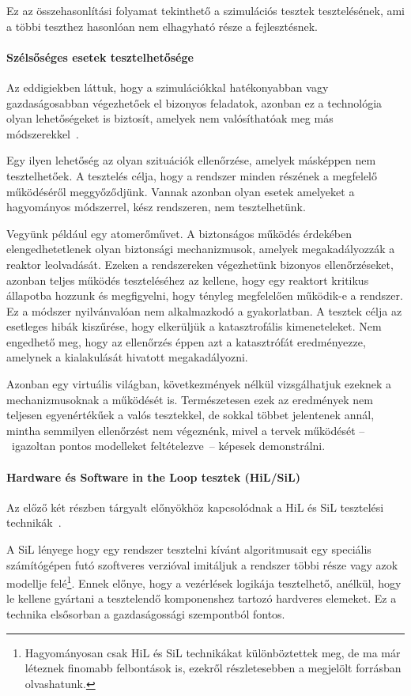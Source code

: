         Ez az összehasonlítási folyamat tekinthető a szimulációs tesztek tesztelésének, ami a többi teszthez hasonlóan nem elhagyható része a fejlesztésnek.

        \paragraph{Szélsőséges esetek tesztelhetősége}
        Az eddigiekben láttuk, hogy a szimulációkkal hatékonyabban vagy gazdaságosabban végezhetőek el bizonyos feladatok, azonban ez a technológia olyan lehetőségeket is biztosít, amelyek nem valósíthatóak meg más módszerekkel~\cite{Gianni2017}.
        
        Egy ilyen lehetőség az olyan szituációk ellenőrzése, amelyek másképpen nem tesztelhetőek. A tesztelés célja, hogy a rendszer minden részének a megfelelő működéséről meggyőződjünk.
        Vannak azonban olyan esetek amelyeket a hagyományos módszerrel, kész rendszeren, nem tesztelhetünk.
        
        Vegyünk például egy atomerőművet. A biztonságos működés érdekében elengedhetetlenek olyan biztonsági mechanizmusok, amelyek megakadályozzák a reaktor leolvadását.
        Ezeken a rendszereken végezhetünk bizonyos ellenőrzéseket, azonban teljes működés teszteléséhez az kellene, hogy egy reaktort kritikus állapotba hozzunk és megfigyelni, hogy tényleg megfelelően működik-e a rendszer.
        Ez a módszer nyilvánvalóan nem alkalmazkodó a gyakorlatban. A tesztek célja az esetleges hibák kiszűrése, hogy elkerüljük a katasztrofális kimeneteleket. Nem engedhető meg, hogy az ellenőrzés éppen azt a katasztrófát eredményezze, amelynek a kialakulását hivatott megakadályozni.
        
        Azonban egy virtuális világban, következmények nélkül vizsgálhatjuk ezeknek a mechanizmusoknak a működését is. Természetesen ezek az eredmények nem teljesen egyenértékűek a valós tesztekkel, de sokkal többet jelentenek annál, mintha semmilyen ellenőrzést nem végeznénk, mivel a tervek működését --~igazoltan pontos modelleket feltételezve~-- képesek demonstrálni.

        \paragraph{Hardware és Software in the Loop tesztek (HiL/SiL)}
        Az előző két részben tárgyalt előnyökhöz kapcsolódnak a HiL és SiL tesztelési technikák~\cite{MST2023}.
        
        A SiL lényege hogy egy rendszer tesztelni kívánt algoritmusait egy speciális számítógépen futó szoftveres verzióval imitáljuk a rendszer többi része vagy azok modellje felé\footnote{Hagyományosan csak HiL és SiL technikákat különböztettek meg, de ma már léteznek finomabb felbontások is, ezekről részletesebben a megjelölt forrásban olvashatunk.}.
        Ennek előnye, hogy a vezérlések logikája tesztelhető, anélkül, hogy le kellene gyártani a tesztelendő komponenshez tartozó hardveres elemeket.
        Ez a technika elsősorban a gazdaságossági szempontból fontos.
    
